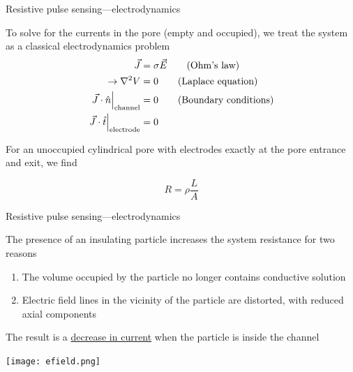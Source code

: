 \begin{frame}[c]{Resistive pulse sensing---electrodynamics}

	To solve for the currents in the pore (empty and occupied), we treat the system as a classical electrodynamics problem \\
		\begin{align}		
			\vec{J} &= \sigma\vec{E} \tag{Ohm's law} \\
			\rightarrow \nabla^{2}V &= 0 \tag{Laplace equation} \\
			\left. \vec{J}\cdot\hat{n}\right\vert_{\mathrm{channel}} &= 0 \tag{Boundary conditions}\\
			\left. \vec{J}\cdot\hat{t}\right\vert_{\mathrm{electrode}} &= 0 \notag
		\end{align}
		
	For an unoccupied cylindrical pore with electrodes exactly at the pore entrance and exit, we find
	
	\begin{equation} \tag{Ideal cylinder}
		R=\rho\frac{L}{A}
	\end{equation}
	

\end{frame}




\begin{frame}[c]{Resistive pulse sensing---electrodynamics}


		The presence of an insulating particle increases the system resistance for two reasons
		
		\begin{enumerate}
			\item The volume occupied by the particle no longer contains conductive solution
			\item Electric field lines in the vicinity of the particle are distorted, with reduced axial components
		\end{enumerate}
		
		The result is a \underline{decrease in current} when the particle is inside the channel
		
		{\centering
			\texttt{[image: efield.png]} \\
			\par
		}
		

\end{frame}




